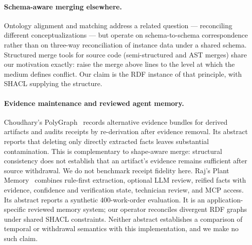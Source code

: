 \paragraph{Schema-aware merging elsewhere.} Ontology alignment and matching
address a related question --- reconciling different conceptualizations --- but
operate on schema-to-schema correspondence rather than on three-way
reconciliation of instance data under a shared schema. Structured merge tools
for source code (semi-structured and AST merges) share our motivation exactly:
raise the merge above lines to the level at which the medium defines conflict.
Our claim is the RDF instance of that principle, with SHACL supplying the
structure.


\paragraph{Evidence maintenance and reviewed agent memory.}
Choudhary's PolyGraph~\cite{choudhary2026receiptstrustworthycleanupagentbuilt}
records alternative evidence bundles for derived artifacts and audits receipts
by re-derivation after evidence removal. Its abstract reports that deleting only
directly extracted facts leaves substantial contamination. This is complementary
to shape-aware merge: structural consistency does not establish that an
artifact's evidence remains sufficient after source withdrawal. We do not
benchmark receipt fidelity here.
Raj's Plant Memory~\cite{raj2026plantmemorytechnicallanguage}
combines rule-first extraction, optional LLM review, reified facts with evidence,
confidence and verification state, technician review, and MCP access. Its abstract
reports a synthetic 400-work-order evaluation. It is an application-specific
reviewed memory system; our operator reconciles divergent RDF graphs under shared
SHACL constraints. Neither abstract establishes a comparison of temporal or
withdrawal semantics with this implementation, and we make no such claim.
